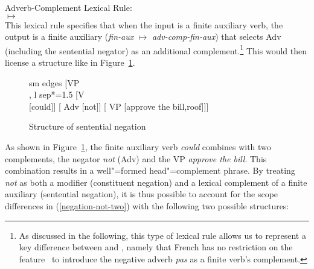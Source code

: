 \documentclass[output=paper,biblatex,babelshorthands,newtxmath,draftmode,colorlinks,citecolor=brown]{langscibook}
\begin{document}
\begin{exe}
\begin{xlist}
\begin{exe}
\begin{xlist}
\ea
Adverb-Complement Lexical Rule:\\
 $\mapsto$\\[2mm]
\hfill{}
\z
%
This lexical rule specifies that when the input is a finite auxiliary verb,
the output is a finite auxiliary (\textit{fin-aux} $\mapsto$ \textit{adv-comp-fin-aux})
that selects Adv (including the sentential negator) as an additional
complement.\footnote{%
As discussed in the following, this type of lexical rule allows us to represent a key difference between  and , namely that French has no restriction on the feature \AUX\ to introduce the negative adverb \emph{pas} as a finite verb’s complement.}  This would then
license a structure like in Figure~\ref{negation-fig:6}.

\begin{figure}
	\begin{forest}
		sm edges
		[VP\\
		, l sep*=1.5
			[V\\
				[could]]
			[ Adv
				[not]]
			[ VP
				[approve the bill,roof]]]
	\end{forest}
\caption{Structure of sentential negation}\label{negation-fig:6}
\end{figure}

\largerpage
As shown in Figure~\ref{negation-fig:6}, the finite auxiliary
verb \textit{could} combines with two complements, the negator
\textit{not} (Adv) and the VP \textit{approve the bill}.
This combination results in a well"=formed head"=complement phrase.
By treating \textit{not} as both a modifier (constituent negation)
and a lexical complement of a finite auxiliary (sentential negation), it is thus possible to
account for the scope differences in (\ref{negation-not-two}) with the
following two possible structures:


\end{xlist}
\end{exe}
\end{xlist}
\end{exe}
\end{document}
